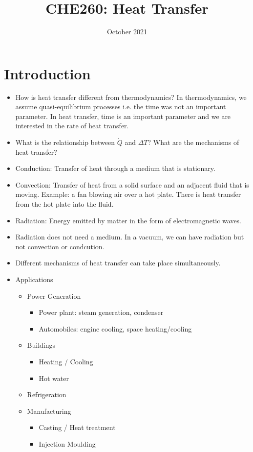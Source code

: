 \documentclass[12pt]{article}
\title{CHE260: Heat Transfer}
\date{October 2021}
\begin{document}
\maketitle
\tableofcontents

\section{Introduction}

\begin{itemize}
    \item How is heat transfer different from thermodynamics? In thermodynamics, we assume quasi-equilibrium processes i.e. the time was not an important parameter. In heat transfer, time is an important parameter and we are interested in the rate of heat transfer. 
    \item What is the relationship between $\dot{Q}$ and $\Delta T$? What are the mechanisms of heat transfer? 
    \item Conduction: Transfer of heat through a medium that is stationary. 
    \item Convection: Transfer of heat from a solid surface and an adjacent fluid that is moving. Example: a fan blowing air over a hot plate. There is heat transfer from the hot plate into the fluid. 
    \item Radiation: Energy emitted by matter in the form of electromagnetic waves. 
    \item Radiation does not need a medium. In a vacuum, we can have radiation but not convection or condcution.
    \item Different mechanisms of heat transfer can take place simultaneously.
    \item Applications \begin{itemize}
        \item Power Generation \begin{itemize}
            \item Power plant: steam generation, condenser
            \item Automobiles: engine cooling, space heating/cooling
        \end{itemize}
        \item Buildings \begin{itemize}
            \item Heating / Cooling
            \item Hot water 
        \end{itemize}
        \item Refrigeration 
        \item Manufacturing \begin{itemize}
            \item Casting / Heat treatment
            \item  Injection Moulding
        \end{itemize}
    \end{itemize}
    

\end{itemize}
\end{document}
